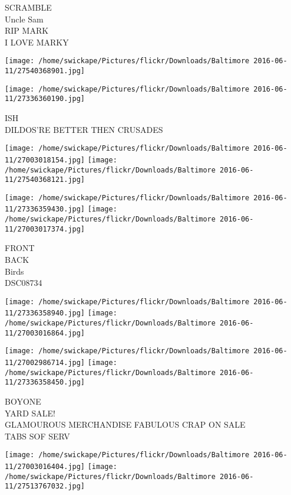 \documentclass[10pt,letterpaper]{article}
\begin{document}
SCRAMBLE\\
Uncle Sam\\
RIP MARK\\
I LOVE MARKY\\
\pagebreak

\texttt{[image: /home/swickape/Pictures/flickr/Downloads/Baltimore 2016-06-11/27540368901.jpg]}

\vspace{0.25in}
\texttt{[image: /home/swickape/Pictures/flickr/Downloads/Baltimore 2016-06-11/27336360190.jpg]}

ISH\\
DILDOS'RE BETTER THEN CRUSADES\\
\pagebreak

\texttt{[image: /home/swickape/Pictures/flickr/Downloads/Baltimore 2016-06-11/27003018154.jpg]}
\texttt{[image: /home/swickape/Pictures/flickr/Downloads/Baltimore 2016-06-11/27540368121.jpg]}

\texttt{[image: /home/swickape/Pictures/flickr/Downloads/Baltimore 2016-06-11/27336359430.jpg]}
\texttt{[image: /home/swickape/Pictures/flickr/Downloads/Baltimore 2016-06-11/27003017374.jpg]}

FRONT\\
BACK\\
Birds\\
DSC08734\\
\pagebreak

\texttt{[image: /home/swickape/Pictures/flickr/Downloads/Baltimore 2016-06-11/27336358940.jpg]}
\texttt{[image: /home/swickape/Pictures/flickr/Downloads/Baltimore 2016-06-11/27003016864.jpg]}

\texttt{[image: /home/swickape/Pictures/flickr/Downloads/Baltimore 2016-06-11/27002986714.jpg]}
\texttt{[image: /home/swickape/Pictures/flickr/Downloads/Baltimore 2016-06-11/27336358450.jpg]}

BOYONE\\
YARD SALE!\\
GLAMOUROUS MERCHANDISE FABULOUS CRAP ON SALE\\
TABS SOF SERV\\
\pagebreak

\texttt{[image: /home/swickape/Pictures/flickr/Downloads/Baltimore 2016-06-11/27003016404.jpg]}
\texttt{[image: /home/swickape/Pictures/flickr/Downloads/Baltimore 2016-06-11/27513767032.jpg]}
\end{document}
